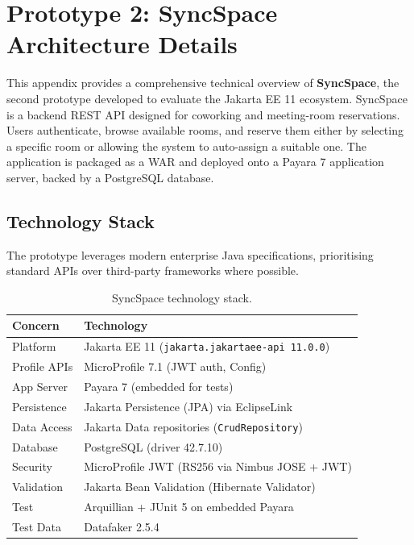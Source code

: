 \chapter{Prototype 2: SyncSpace Architecture Details}
\label{app:syncspace}

This appendix provides a comprehensive technical overview of \textbf{SyncSpace},
the second prototype developed to evaluate the Jakarta EE 11 ecosystem. SyncSpace
is a backend \ac{REST} \ac{API} designed for coworking and meeting-room reservations.
Users authenticate, browse available rooms, and reserve them either by
selecting a specific room or allowing the system to auto-assign a suitable
one. The application is packaged as a \ac{WAR} and deployed onto a Payara 7
application server, backed by a PostgreSQL database.

\section{Technology Stack}
\label{app:syncspace-stack}

The prototype leverages modern enterprise Java specifications, prioritising standard
APIs over third-party frameworks where possible.

\begin{table}[H]
	\centering
	\renewcommand{\arraystretch}{1.2}
	\begin{tabular}{ll}
		\toprule \textbf{Concern} & \textbf{Technology}                                      \\
		\midrule Platform         & Jakarta EE 11 (\texttt{jakarta.jakartaee-api 11.0.0})    \\
		Profile APIs              & MicroProfile 7.1 (\ac{JWT} auth, Config)                 \\
		App Server                & Payara 7 (embedded for tests)                            \\
		Persistence               & Jakarta Persistence (\ac{JPA}) via EclipseLink           \\
		Data Access               & Jakarta Data repositories (\texttt{CrudRepository})      \\
		Database                  & PostgreSQL (driver 42.7.10)                              \\
		Security                  & MicroProfile \ac{JWT} (RS256 via Nimbus JOSE + \ac{JWT}) \\
		Validation                & Jakarta Bean Validation (Hibernate Validator)            \\
		Test                      & Arquillian + JUnit 5 on embedded Payara                  \\
		Test Data                 & Datafaker 2.5.4                                          \\
		\bottomrule
	\end{tabular}
	\caption{SyncSpace technology stack.}
\end{table}

